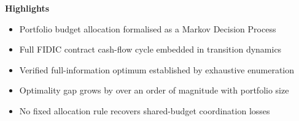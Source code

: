 \documentclass[11pt]{article}
\begin{document}
\noindent\textbf{Highlights}

\begin{itemize}

  \item Portfolio budget allocation formalised as a Markov Decision Process %

  \item Full FIDIC contract cash-flow cycle embedded in transition dynamics %

  \item Verified full-information optimum established by exhaustive enumeration %

  \item Optimality gap grows by over an order of magnitude with portfolio size %

  \item No fixed allocation rule recovers shared-budget coordination losses %

\end{itemize}
\end{document}
